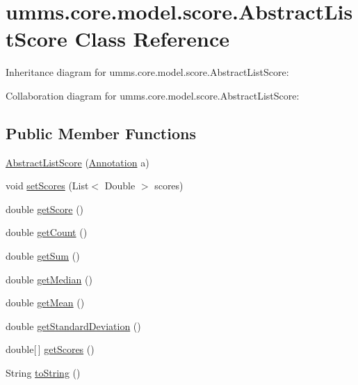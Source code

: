 \hypertarget{classumms_1_1core_1_1model_1_1score_1_1_abstract_list_score}{\section{umms.\+core.\+model.\+score.\+Abstract\+List\+Score Class Reference}
\label{classumms_1_1core_1_1model_1_1score_1_1_abstract_list_score}
}


Inheritance diagram for umms.\+core.\+model.\+score.\+Abstract\+List\+Score\+:


Collaboration diagram for umms.\+core.\+model.\+score.\+Abstract\+List\+Score\+:
\subsection*{Public Member Functions}
\begin{DoxyCompactItemize}
\item 
\hyperlink{classumms_1_1core_1_1model_1_1score_1_1_abstract_list_score_a474c245b7736a2408b5942bc92975a3f}{Abstract\+List\+Score} (\hyperlink{interfaceumms_1_1core_1_1annotation_1_1_annotation}{Annotation} a)
\item 
void \hyperlink{classumms_1_1core_1_1model_1_1score_1_1_abstract_list_score_aa3a95daf6ebcb67546b9fccd018e8bcb}{set\+Scores} (List$<$ Double $>$ scores)
\item 
double \hyperlink{classumms_1_1core_1_1model_1_1score_1_1_abstract_list_score_a2927a97c83af8b901402b0c84c414a07}{get\+Score} ()
\item 
double \hyperlink{classumms_1_1core_1_1model_1_1score_1_1_abstract_list_score_a807a62ef44088c4262d7f6dd8ac837ae}{get\+Count} ()
\item 
double \hyperlink{classumms_1_1core_1_1model_1_1score_1_1_abstract_list_score_a8427958d055d5c9504f5fa1c47f0401e}{get\+Sum} ()
\item 
double \hyperlink{classumms_1_1core_1_1model_1_1score_1_1_abstract_list_score_a9c3fcd18daa8ec8fffffa8191df3dbe3}{get\+Median} ()
\item 
double \hyperlink{classumms_1_1core_1_1model_1_1score_1_1_abstract_list_score_a29fc1a2172e53228a768071d70dbabd1}{get\+Mean} ()
\item 
double \hyperlink{classumms_1_1core_1_1model_1_1score_1_1_abstract_list_score_a29d42985031bef2fd4cc340eeea8fd55}{get\+Standard\+Deviation} ()
\item 
double\mbox{[}$\,$\mbox{]} \hyperlink{classumms_1_1core_1_1model_1_1score_1_1_abstract_list_score_a4b08f13c6d1ee4abe0d0bbb1e5987251}{get\+Scores} ()
\item 
String \hyperlink{classumms_1_1core_1_1model_1_1score_1_1_abstract_list_score_a1c9bc9338210f2d04dd3f6cf68d12c10}{to\+String} ()
\end{DoxyCompactItemize}
